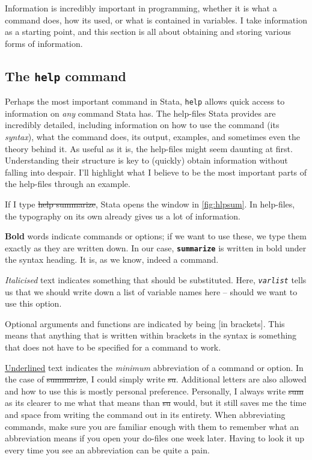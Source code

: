 
Information is incredibly important in programming,
whether it is what a command does, how its used,
or what is contained in variables.
I take information as a starting point,
and this section is all about obtaining and storing various forms of information.


\subsection{The \texttt{help} command}

Perhaps the most important command in Stata,
\texttt{help} allows quick access to information on \emph{any} command Stata has.
The help-files Stata provides are incredibly detailed,
including information on how to use the command (its \emph{syntax}),
what the command does, its output, examples,
and sometimes even the theory behind it.
As useful as it is, the help-files might seem daunting at first.
Understanding their structure is key to (quickly) obtain information without falling into despair.
I'll highlight what I believe to be the most important parts of the help-files through an example.

If I type \st{help summarize},
Stata opens the window in \cref{fig:hlpsum}.
In help-files, the typography on its own already gives us a lot of information.

\textbf{Bold} words indicate commands or options; if we want to use these,
we type them exactly as they are written down.
In our case,
\textbf{\texttt{summarize}} is written in bold under the syntax heading.
It is, as we know, indeed a command.

\textit{Italicised} text indicates something that should be substituted.
Here, \textit{\texttt{varlist}} tells us that we should write down a list of variable names here -- should we want to use this option.

Optional arguments and functions are indicated by being [in brackets].
This means that anything that is written within brackets in the syntax is something that does not have to be specified for a command to work.

\underline{Underlined} text indicates the \emph{minimum} abbreviation of a command or option.
In the case of \st{summarize},
I could simply write \st{su}.
Additional letters are also allowed and how to use this is mostly personal preference.
Personally, I always write \st{sum} as its clearer to me what that means than \st{su} would,
but it still saves me the time and space from writing the command out in its entirety.
When abbreviating commands,
make sure you are familiar enough with them to remember what an abbreviation means if you open your do-files one week later.
Having to look it up every time you see an abbreviation can be quite a pain.

